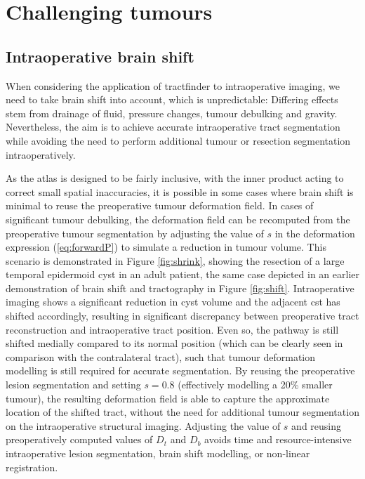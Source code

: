 \section{Challenging tumours}

\subsection{Intraoperative brain shift}
\label{sec:imri}

When considering the application of tractfinder to intraoperative imaging, we need to take brain shift into account, which is unpredictable:
Differing effects stem from drainage of fluid, pressure changes, tumour debulking and gravity.
Nevertheless, the aim is to achieve accurate intraoperative tract segmentation while avoiding the need to perform additional tumour or resection segmentation intraoperatively.

As the atlas is designed to be fairly inclusive, with the inner product acting to correct small spatial inaccuracies, it is possible in some cases where brain shift is minimal to reuse the preoperative tumour deformation field.
In cases of significant tumour debulking, the deformation field can be recomputed from the preoperative tumour segmentation by adjusting the value of $s$ in the deformation expression (\ref{eq:forwardP}) to simulate a reduction in tumour volume.
This scenario is demonstrated in Figure \ref{fig:shrink}, showing the resection of a large temporal epidermoid cyst in an adult patient, the same case depicted in an earlier demonstration of brain shift and tractography in Figure \ref{fig:shift}.
Intraoperative imaging shows a significant reduction in cyst volume and the adjacent \gls{cst} has shifted accordingly, resulting in significant discrepancy between preoperative tract reconstruction and intraoperative tract position.
Even so, the pathway is still shifted medially compared to its normal position (which can be clearly seen in comparison with the contralateral tract), such that tumour deformation modelling is still required for accurate segmentation.
By reusing the preoperative lesion segmentation and setting $s=0.8$ (effectively modelling a 20\% smaller tumour), the resulting deformation field is able to capture the approximate location of the shifted tract, without the need for additional tumour segmentation on the intraoperative structural imaging.
Adjusting the value of $s$ and reusing preoperatively computed values of $D_t$ and $D_b$ avoids time and resource-intensive intraoperative lesion segmentation, brain shift modelling, or non-linear registration.

